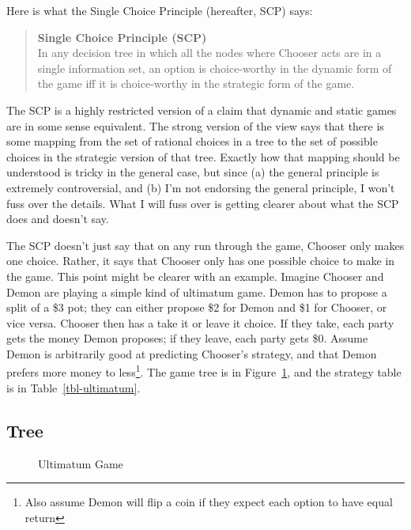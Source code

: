 \documentclass[
  10pt,
  letterpaper,
  DIV=11,
  numbers=noendperiod,
  twoside]{scrartcl}
\begin{document}
Here is what the Single Choice Principle (hereafter, SCP) says:

\begin{quote}
\textbf{Single Choice Principle (SCP)}\\
In any decision tree in which all the nodes where Chooser acts are in a
single information set, an option is choice-worthy in the dynamic form
of the game iff it is choice-worthy in the strategic form of the game.
\end{quote}

The SCP is a highly restricted version of a claim that dynamic and
static games are in some sense equivalent. The strong version of the
view says that there is some mapping from the set of rational choices in
a tree to the set of possible choices in the strategic version of that
tree. Exactly how that mapping should be understood is tricky in the
general case, but since (a) the general principle is extremely
controversial, and (b) I'm not endorsing the general principle, I won't
fuss over the details. What I will fuss over is getting clearer about
what the SCP does and doesn't say.

The SCP doesn't just say that on any run through the game, Chooser only
makes one choice. Rather, it says that Chooser only has one possible
choice to make in the game. This point might be clearer with an example.
Imagine Chooser and Demon are playing a simple kind of ultimatum game.
Demon has to propose a split of a \$3 pot; they can either propose \$2
for Demon and \$1 for Chooser, or vice versa. Chooser then has a take it
or leave it choice. If they take, each party gets the money Demon
proposes; if they leave, each party gets \$0. Assume Demon is
arbitrarily good at predicting Chooser's strategy, and that Demon
prefers more money to less\footnote{Also assume Demon will flip a coin
  if they expect each option to have equal return}. The game tree is in
Figure~\ref{fig-ultimatum}, and the strategy table is in
Table~\ref{tbl-ultimatum}.

\subsection{Tree}

\begin{figure}


\caption{\label{fig-ultimatum}Ultimatum Game}

\end{figure}%
\end{document}
